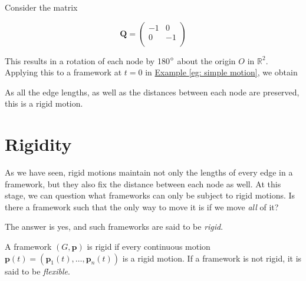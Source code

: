 \begin{example}
Consider the matrix 

\[ \mathbf{Q} = 
\begin{pmatrix}
-1 & 0\\
0 & -1\\
\end{pmatrix}
\]

\begin{flushleft}
This results in a rotation of each node by 180$\degree$ about the origin $O$ in $\mathbb{R}^2$. Applying this to a framework at $t = 0$ in \hyperref[eg: simple motion]{Example \ref*{eg: simple motion}}, we obtain

\begin{figure}[htbp]
    \centering
    
\end{figure}

As all the edge lengths, as well as the distances between each node are preserved, this is a rigid motion.    
\end{flushleft}
\end{example}

\section{Rigidity}
\begin{flushleft}
As we have seen, rigid motions maintain not only the lengths of every edge in a framework, but they also fix the distance between each node as well. At this stage, we can question what frameworks can only be subject to rigid motions. Is there a framework such that the only way to move it is if we move \textit{all} of it?

The answer is yes, and such frameworks are said to be \textit{rigid}.
\end{flushleft}

\begin{definition}
\label{def: rigid}
A framework $(G,\mathbf{p})$ is rigid if every continuous motion $\mathbf{p}(t) = (\mathbf{p}_1(t), \hdots, \mathbf{p}_n(t))$ is a rigid motion. 
If a framework is not rigid, it is said to be \textit{flexible}.
\end{definition}

